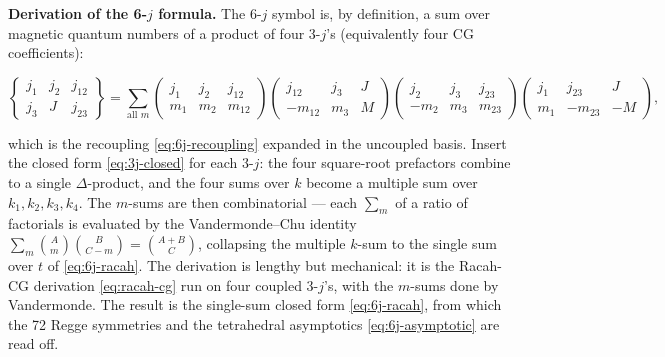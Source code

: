 \medskip\noindent\textbf{Derivation of the 6-$j$ formula.} The 6-$j$ symbol is, by definition, a sum over magnetic quantum numbers of a product of four 3-$j$'s (equivalently four CG coefficients):
\begin{linenomath}
\begin{equation}
\begin{Bmatrix}j_{1}&j_{2}&j_{12}\\ j_{3}&J&j_{23}\end{Bmatrix}
=\sum_{\text{all }m}\begin{pmatrix}j_{1}&j_{2}&j_{12}\\ m_{1}&m_{2}&m_{12}\end{pmatrix}\!\begin{pmatrix}j_{12}&j_{3}&J\\ -m_{12}&m_{3}&M\end{pmatrix}\!\begin{pmatrix}j_{2}&j_{3}&j_{23}\\ -m_{2}&m_{3}&m_{23}\end{pmatrix}\!\begin{pmatrix}j_{1}&j_{23}&J\\ m_{1}&-m_{23}&-M\end{pmatrix},
\label{eq:6j-as-3j-product}
\end{equation}
\end{linenomath}
which is the recoupling \eqref{eq:6j-recoupling} expanded in the uncoupled basis. Insert the closed form \eqref{eq:3j-closed} for each 3-$j$: the four square-root prefactors combine to a single $\Delta$-product, and the four sums over $k$ become a multiple sum over $k_{1},k_{2},k_{3},k_{4}$. The $m$-sums are then combinatorial --- each $\sum_{m}$ of a ratio of factorials is evaluated by the Vandermonde--Chu identity $\sum_{m}\binom{A}{m}\binom{B}{C-m}=\binom{A+B}{C}$, collapsing the multiple $k$-sum to the single sum over $t$ of \eqref{eq:6j-racah}. The derivation is lengthy but mechanical: it is the Racah-CG derivation \eqref{eq:racah-cg} run on four coupled 3-$j$'s, with the $m$-sums done by Vandermonde. The result is the single-sum closed form \eqref{eq:6j-racah}, from which the 72 Regge symmetries and the tetrahedral asymptotics \eqref{eq:6j-asymptotic} are read off.

